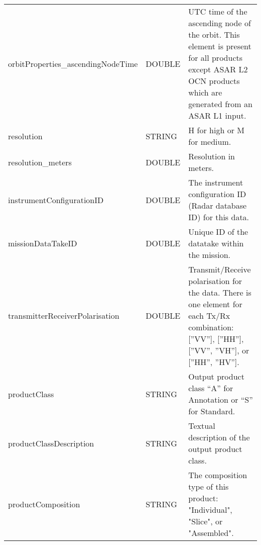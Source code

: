 \documentclass[lettersize,journal]{IEEEtran}
\begin{document}
\begin{table*}[h]
{\begin{tabular}{llp{12cm}}
orbitProperties\_ascendingNodeTime               & DOUBLE                            & UTC time of the ascending node of the orbit. This element is present for all products except ASAR L2 OCN products which are generated from an ASAR L1 input.            \\
resolution                                       & STRING                            & H for high or M for medium.                                                                                                                                             \\
resolution\_meters                               & DOUBLE                            & Resolution in meters.                                                                                                                                                   \\
instrumentConfigurationID                        & DOUBLE                            & The instrument configuration ID (Radar database ID) for this data.                                                                                                      \\
missionDataTakeID                                & DOUBLE                            & Unique ID of the datatake within the mission.                                                                                                                           \\
transmitterReceiverPolarisation                  & DOUBLE                            & Transmit/Receive polarisation for the data. There is one element for each Tx/Rx combination: {[}''VV''{]}, {[}''HH''{]}, {[}''VV'', ''VH''{]}, or {[}''HH'', ''HV''{]}. \\
productClass                                     & STRING                            & Output product class “A” for Annotation or “S” for Standard.                                                                                                            \\
productClassDescription                          & STRING                            & Textual description of the output product class.                                                                                                                        \\
productComposition                               & STRING                            & The composition type of this product: "Individual", "Slice", or "Assembled".                                                                                            \\

\end{tabular}}
\end{table*}
\end{document}
